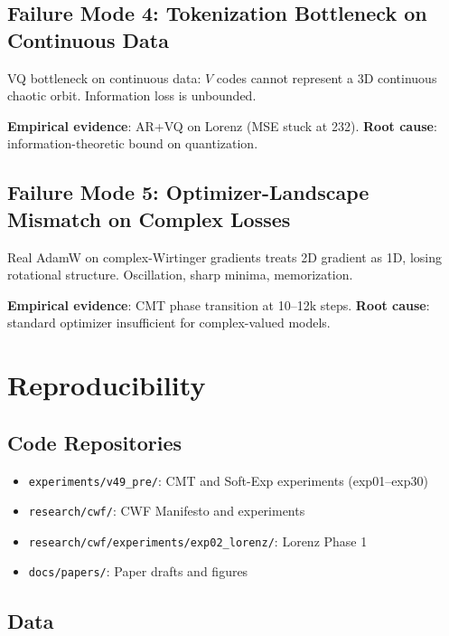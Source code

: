 \documentclass{article}
\begin{document}
\subsection{Failure Mode 4: Tokenization Bottleneck on Continuous Data}

VQ bottleneck on continuous data: $V$ codes cannot represent a 3D continuous chaotic orbit. Information loss is unbounded.

\textbf{Empirical evidence}: AR+VQ on Lorenz (MSE stuck at 232). \textbf{Root cause}: information-theoretic bound on quantization.

\subsection{Failure Mode 5: Optimizer-Landscape Mismatch on Complex Losses}

Real AdamW on complex-Wirtinger gradients treats 2D gradient as 1D, losing rotational structure. Oscillation, sharp minima, memorization.

\textbf{Empirical evidence}: CMT phase transition at 10--12k steps. \textbf{Root cause}: standard optimizer insufficient for complex-valued models.


\section{Reproducibility}

\subsection{Code Repositories}

\begin{itemize}
    \item \texttt{experiments/v49\_pre/}: CMT and Soft-Exp experiments (exp01--exp30)
    \item \texttt{research/cwf/}: CWF Manifesto and experiments
    \item \texttt{research/cwf/experiments/exp02\_lorenz/}: Lorenz Phase 1
    \item \texttt{docs/papers/}: Paper drafts and figures
\end{itemize}

\subsection{Data}
\end{document}
